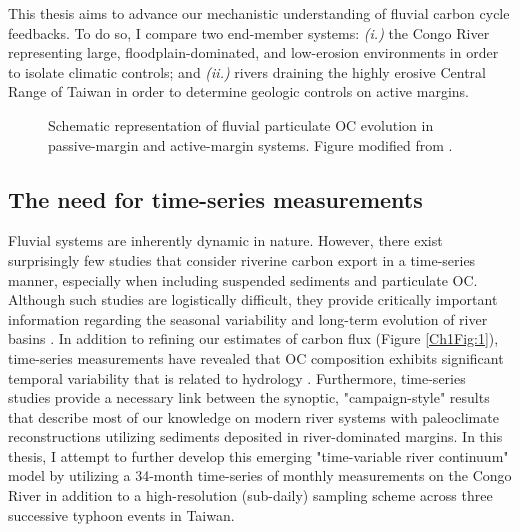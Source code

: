 This thesis aims to advance our mechanistic understanding of fluvial carbon cycle feedbacks. To do so, I compare two end-member systems: \textit{(i.)} the Congo River representing large, floodplain-dominated, and low-erosion environments in order to isolate climatic controls; and \textit{(ii.)} rivers draining the highly erosive Central Range of Taiwan in order to determine geologic controls on active margins.

\begin{figure}[t]
	\caption[Schematic representation of the river continuum]{Schematic representation of fluvial particulate OC evolution in passive-margin and active-margin systems. Figure modified from \citet{Blair:2012du}.}
	\label{Ch1Fig:3} 
\end{figure}

\subsection{The need for time-series measurements}

Fluvial systems are inherently dynamic in nature. However, there exist surprisingly few studies that consider riverine carbon export in a time-series manner, especially when including suspended sediments and particulate OC. Although such studies are logistically difficult, they provide critically important information regarding the seasonal variability and long-term evolution of river basins \citep[\textit{e.g.}][]{Peterson:2002hj,Raymond:2003fd,Milliman:2011ug,Voss:2015dd}. In addition to refining our estimates of carbon flux (Figure \ref{Ch1Fig:1}), time-series measurements have revealed that OC composition exhibits significant temporal variability that is related to hydrology \citep{Voss:2015dd,Hemingway:2016bq}. Furthermore, time-series studies provide a necessary link between the synoptic, "campaign-style" results that describe most of our knowledge on modern river systems with paleoclimate reconstructions utilizing sediments deposited in river-dominated margins. In this thesis, I attempt to further develop this emerging "time-variable river continuum" model by utilizing a 34-month time-series of monthly measurements on the Congo River in addition to a high-resolution (sub-daily) sampling scheme across three successive typhoon events in Taiwan. 

